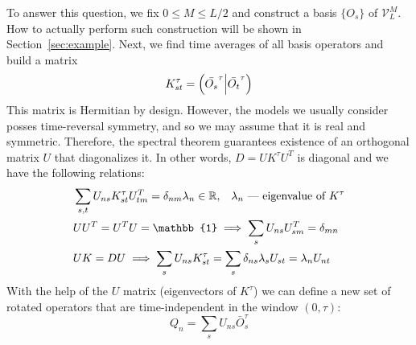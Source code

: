 To answer this question, we fix \(0\leq M \leq L/2\) and construct a basis \(\{O_s\}\) of \(\mathcal{V}_L^M\). How to actually perform such construction
will be shown in Section~\ref{sec:example}. Next, we find time averages of all basis operators and build a matrix
\begin{equation}
  K_{st}^{\tau} = \left(\bar{O_s}^{\tau} \middle| \bar{O_t}^{\tau}\right)
  \label{eq:stiffness matrix}
\end{equation}
This matrix is Hermitian by design. However, the models we usually
consider posses time-reversal symmetry, and so we may assume that it is real and symmetric.
Therefore, the spectral theorem guarantees existence of an orthogonal matrix \(U\) that
diagonalizes it. In other words, \(D = UK^{\tau}U^{T}\) is diagonal and we have the following relations:
\begin{align}
  &\sum_{s, t} U_{n s} K_{s t}^{\tau} U_{t m}^{T}=\delta_{nm} \lambda_{n} \in \RR,\;\;\; \lambda_n \text{ --- eigenvalue of }K^{\tau} \nonumber \\
  &UU^{T} = U^{T}U = \mathbb{1} \implies \sum_{s} U_{ns}U_{sm}^{T} = \delta_{mn}\nonumber\\
  & U K = D U \implies \sum_s U_{ns} K_{st}^{\tau} = \sum_s  \delta_{ns} \lambda_s U_{st} = \lambda_n U_{nt}\label{eq:properties}
\end{align} 
With the help of the \(U\) matrix (eigenvectors of \(K^{\tau}\)) we can define a new set of rotated operators that
are time-independent in the window \(\left(0,\tau\right)\):
\begin{equation}
  Q_n = \sum_s U_{ns}\bar{O}_{s}^{\tau}\label{eq:new operators}
\end{equation} 

